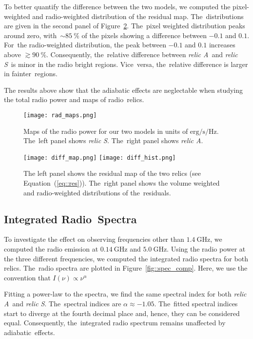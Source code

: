 \documentclass[galaxies,article,accept,moreauthors,pdftex]{mdpi}
\newcommand{\sek}{\mathrm{s}}
\newcommand{\erg}{\mathrm{erg}}
\newcommand{\Hz}{\mathrm{Hz}}
\newcommand{\GHz}{\mathrm{GHz}}
\newcommand{\relicA}{\textit{relic A}}
\newcommand{\relicS}{\textit{relic S}}
\begin{document}
To better quantify the difference between the two models, we computed the pixel-weighted and radio-weighted distribution of the residual map. The~distributions are given in the second panel of Figure~\ref{fig::diff_maps}. The~pixel weighted distribution peaks around zero, with~$\sim 85 \ \%$ of the pixels showing a difference between $-0.1$ and $0.1$. For~the radio-weighted distribution, the peak between $-0.1$ and $0.1$ increases above $\gtrsim 90 \ \%$. Consequently, the~relative difference between \relicA \ and \relicS \  is minor in the radio bright regions. Vice~versa, the~relative difference is larger in fainter~regions. 

The results above show that the adiabatic effects are neglectable when studying the total radio power and maps of radio~relics.



\begin{figure}[H]
 \texttt{[image: rad\_maps.png]}
 \caption{Maps of the radio power for our two models in units of $\erg/\sek/\Hz$. The~left panel shows \relicS. The~right panel shows \relicA.}
 \label{fig::rad_maps}
\end{figure}
\unskip


\begin{figure}[H]
 \texttt{[image: diff\_map.png]}
 \texttt{[image: diff\_hist.png]}
 \caption{The left panel shows the residual map of the two relics (see Equation~(\ref{eq::res})). The~right panel shows the volume weighted and radio-weighted distributions of the~residuals.}
 \label{fig::diff_maps}
\end{figure}
\unskip

\subsection{Integrated Radio~Spectra}

To investigate the effect on observing frequencies other than $1.4 \ \GHz$, we computed the radio emission at $0.14 \ \GHz$ and $5.0 \ \GHz$. Using the radio power at the three different frequencies, we computed the integrated radio spectra for both relics. The~radio spectra are plotted in Figure~\ref{fig::spec_comp}. Here, we use the convention that $I(\nu) \propto \nu^{\alpha}$


Fitting a power-law to the spectra, we find the same spectral index for both \relicA \ and \relicS. The~spectral indices are $\alpha \approx -1.05$. The~fitted spectral indices start to diverge at the fourth decimal place and, hence, they can be considered equal. Consequently, the~integrated radio spectrum remains unaffected by adiabatic~effects.  
\end{document}
